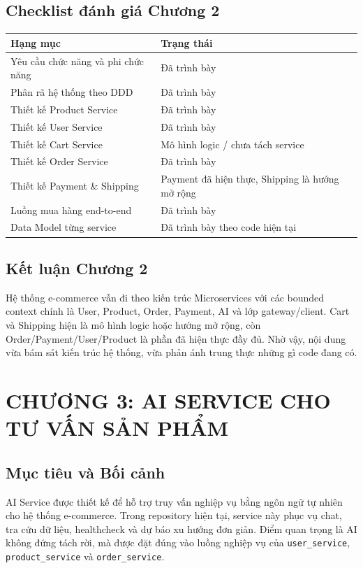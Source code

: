 \documentclass[12pt,a4paper]{article}
\begin{document}
\subsection{Checklist đánh giá Chương 2}
\begin{longtable}{p{8.8cm}p{4.8cm}}
\toprule
\textbf{Hạng mục} & \textbf{Trạng thái} \\
\midrule
Yêu cầu chức năng và phi chức năng & Đã trình bày \\
Phân rã hệ thống theo DDD & Đã trình bày \\
Thiết kế Product Service & Đã trình bày \\
Thiết kế User Service & Đã trình bày \\
Thiết kế Cart Service & Mô hình logic / chưa tách service \\
Thiết kế Order Service & Đã trình bày \\
Thiết kế Payment \& Shipping & Payment đã hiện thực, Shipping là hướng mở rộng \\
Luồng mua hàng end-to-end & Đã trình bày \\
Data Model từng service & Đã trình bày theo code hiện tại \\
\bottomrule
\end{longtable}

\subsection{Kết luận Chương 2}
Hệ thống e-commerce vẫn đi theo kiến trúc Microservices với các bounded context chính là User, Product, Order, Payment, AI và lớp gateway/client. Cart và Shipping hiện là mô hình logic hoặc hướng mở rộng, còn Order/Payment/User/Product là phần đã hiện thực đầy đủ. Nhờ vậy, nội dung vừa bám sát kiến trúc hệ thống, vừa phản ánh trung thực những gì code đang có.

\section{CHƯƠNG 3: AI SERVICE CHO TƯ VẤN SẢN PHẨM}
\subsection{Mục tiêu và Bối cảnh}
AI Service được thiết kế để hỗ trợ truy vấn nghiệp vụ bằng ngôn ngữ tự nhiên cho hệ thống e-commerce. Trong repository hiện tại, service này phục vụ chat, tra cứu dữ liệu, healthcheck và dự báo xu hướng đơn giản. Điểm quan trọng là AI không đứng tách rời, mà được đặt đúng vào luồng nghiệp vụ của \texttt{user\_service}, \texttt{product\_service} và \texttt{order\_service}.
\end{document}
